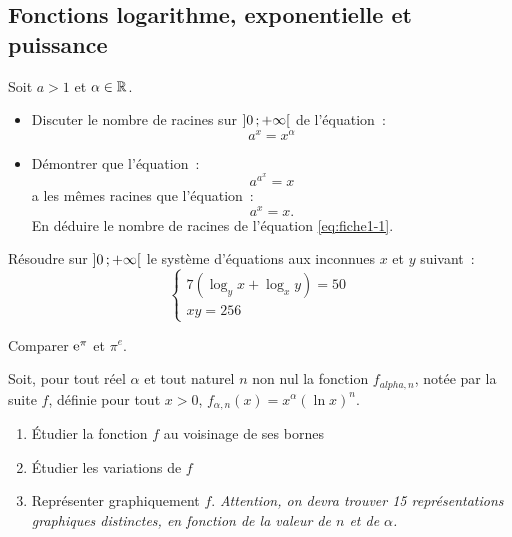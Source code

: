 \subsection{Fonctions logarithme, exponentielle et puissance}
\begin{exercice}
    Soit \(a > 1\) et \(\alpha \in \mathbb{R}\).
    \begin{itemize}
        \item Discuter le nombre de racines sur \(\left] 0 \, ;  +\infty \right[\) de 
            l'équation~:
            \begin{equation}
                \label{eq:fiche1-1}
                a^x = x^\alpha
            \end{equation}
        \item Démontrer que l'équation~:
            \begin{equation}
                a^{a^x} = x
            \end{equation}
            a les mêmes racines que l'équation~:
            \begin{equation}
                a^x = x.
            \end{equation}
            En déduire le nombre de racines de l'équation \eqref{eq:fiche1-1}.
    \end{itemize}
\end{exercice}
\begin{exercice}
    Résoudre sur \(\left] 0 \, ;  +\infty \right[\) le système d'équations aux 
    inconnues \(x\) et \(y\) suivant~:
    \begin{equation}
        \begin{cases} 7(\log_y x +\log_x y) = 50 \\ xy = 256 \end{cases} 
    \end{equation}
\end{exercice}
\begin{exercice}
    Comparer \(\operatorname{e}^\pi\) et \(\pi^e\).
\end{exercice}
\begin{exercice}
    Soit, pour tout réel \(\alpha\) et tout naturel \(n\) non nul la fonction 
    \(f_{alpha, n}\), notée par la suite $f$, définie pour tout \(x>0\), 
    \(f_{\alpha, n}(x) = x^\alpha (\ln x)^n \).
    \begin{enumerate}
        \item Étudier la fonction \(f\) au voisinage de ses bornes
        \item Étudier les variations de \(f\)
        \item Représenter graphiquement \(f\). \emph{Attention, on devra trouver 
                15 représentations graphiques distinctes, en fonction de la valeur 
            de \(n\) et de \(\alpha\).}
    \end{enumerate}
\end{exercice}
